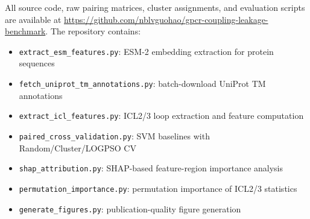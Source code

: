 \documentclass[11pt,a4paper]{article}
\begin{document}
All source code, raw pairing matrices, cluster assignments, and evaluation scripts are available at \url{https://github.com/nblvguohao/gpcr-coupling-leakage-benchmark}. The repository contains:
\begin{itemize}
    \item \texttt{extract\_esm\_features.py}: ESM-2 embedding extraction for protein sequences
    \item \texttt{fetch\_uniprot\_tm\_annotations.py}: batch-download UniProt TM annotations
    \item \texttt{extract\_icl\_features.py}: ICL2/3 loop extraction and feature computation
    \item \texttt{paired\_cross\_validation.py}: SVM baselines with Random/Cluster/LOGPSO CV
    \item \texttt{shap\_attribution.py}: SHAP-based feature-region importance analysis
    \item \texttt{permutation\_importance.py}: permutation importance of ICL2/3 statistics
    \item \texttt{generate\_figures.py}: publication-quality figure generation
\end{itemize}
\end{document}
